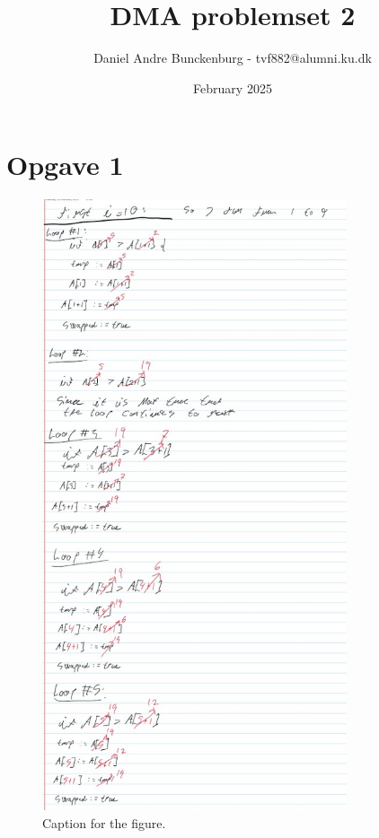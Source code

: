 \documentclass{article}
\title{DMA problemset 2}
\author{Daniel Andre Bunckenburg - tvf882@alumni.ku.dk}
\date{February 2025}
\begin{document}
\maketitle

\newpage

\section{Opgave 1}

\begin{figure}[htbp]
    \centering
    \includegraphics[width=0.8\textwidth]{Figures/problemset2_1.jpg}
    \caption{Caption for the figure.}
    \label{fig:myfigure}
\end{figure}
\end{document}
